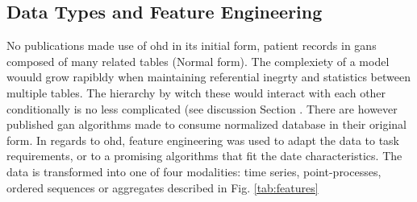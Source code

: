  \subsection{Data Types and Feature Engineering}
    No publications made use of \gls{ohd} in its initial form, patient records in \glspl{gan} composed of many related tables (Normal form). The complexiety of a model wouuld grow rapibldy when maintaining referential inegrty and statistics between multiple tables. The hierarchy by witch these would interact with each other conditionally is no less complicated (see discussion Section . There are however published \gls{gan} algorithms made to consume normalized database in their original form. \todo In regards to \gls{ohd}, feature engineering was used to adapt the data to task requirements, or to a promising algorithms that fit the date characteristics. The data is transformed into one of four modalities: time series, point-processes, ordered sequences or aggregates described in Fig. \ref{tab:features}
    
    